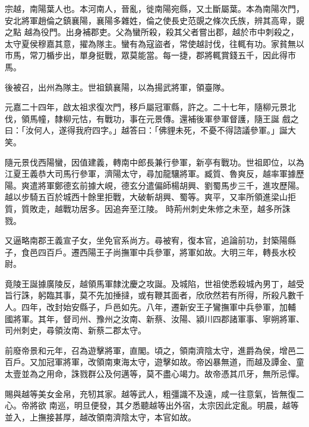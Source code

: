 
\begin{pinyinscope}

 宗越，南陽葉人也。本河南人，晉亂，徙南陽宛縣，又土斷屬葉。本為南陽次門，安北將軍趙倫之鎮襄陽，襄陽多雜姓，倫之使長史范覬之條次氏族，辨其高卑，覬之點
 越為役門。出身補郡吏。父為蠻所殺，殺其父者嘗出郡，越於市中刺殺之，太守夏侯穆嘉其意，擢為隊主。蠻有為寇盜者，常使越討伐，往輒有功。家貧無以市馬，常刀楯步出，單身挺戰，眾莫能當。每一捷，郡將輒賞錢五千，因此得市馬。



 後被召，出州為隊主。世祖鎮襄陽，以為揚武將軍，領臺隊。



 元嘉二十四年，啟太祖求復次門，移戶屬冠軍縣，許之。二十七年，隨柳元景北伐，領馬幢，隸柳元怙，有戰功，事在元景傳。還補後軍參軍督護，隨王誕
 戲之曰：「汝何人，遂得我府四字。」越答曰：「佛貍未死，不憂不得諮議參軍。」誕大笑。



 隨元景伐西陽蠻，因值建義，轉南中郎長兼行參軍，新亭有戰功。世祖即位，以為江夏王義恭大司馬行參軍，濟陽太守，尋加龍驤將軍。臧質、魯爽反，越率軍據歷陽。爽遣將軍鄭德玄前據大峴，德玄分遣偏師楊胡興、劉蜀馬步三千，進攻歷陽。越以步騎五百於城西十餘里拒戰，大破斬胡興、蜀等。爽平，又率所領進梁山拒質，質敗走，越戰功居多。因追奔至江陵。
 時荊州刺史朱修之未至，越多所誅戮。



 又逼略南郡王義宣子女，坐免官系尚方。尋被宥，復本官，追論前功，封築陽縣子，食邑四百戶。遷西陽王子尚撫軍中兵參軍，將軍如故。大明三年，轉長水校尉。



 竟陵王誕據廣陵反，越領馬軍隸沈慶之攻誕。及城陷，世祖使悉殺城內男丁，越受旨行誅，躬臨其事，莫不先加捶撻，或有鞭其面者，欣欣然若有所得，所殺凡數千人。四年，改封始安縣子，戶邑如先。八年，遷新安王子鸞撫軍中兵參軍，加輔
 國將軍。其年，督司州、豫州之汝南、新蔡、汝陽、潁川四郡諸軍事、寧朔將軍、司州刺史，尋領汝南、新蔡二郡太守。



 前廢帝景和元年，召為遊擊將軍，直閣。頃之，領南濟陰太守，進爵為侯，增邑二百戶。又加冠軍將軍，改領南東海太守，遊擊如故。帝凶暴無道，而越及譚金、童太壹並為之用命，誅戮群公及何邁等，莫不盡心竭力。故帝憑其爪牙，無所忌憚。



 賜與越等美女金帛，充牣其家。越等武人，粗彊識不及遠，咸一往意氣，皆無復二心。帝將欲
 南巡，明旦便發，其夕悉聽越等出外宿，太宗因此定亂。明晨，越等並入，上撫接甚厚，越改領南濟陰太守，本官如故。




\end{pinyinscope}
